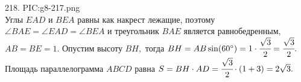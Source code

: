 218. {{PIC:g8-217.png}}\\
Углы $EAD$ и $BEA$ равны как накрест лежащие, поэтому $\angle BAE=\angle EAD=\angle BEA$ и треугольник $BAE$ является равнобедренным, $AB=BE=1.$ Опустим высоту $BH,$ тогда $BH=AB\sin(60^\circ)=1\cdot\cfrac{\sqrt{3}}{2}=\cfrac{\sqrt{3}}{2}.$ Площадь параллелограмма $ABCD$ равна $S=BH\cdot AD=\cfrac{\sqrt{3}}{2}\cdot(1+3)=2\sqrt{3}.$\\
